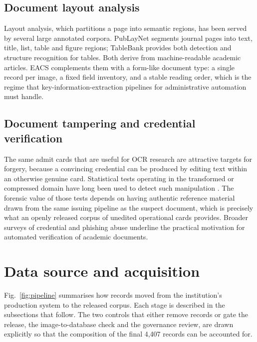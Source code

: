 \documentclass[a4paper,fleqn]{cas-dc}
\begin{document}
\subsection{Document layout analysis}

Layout analysis, which partitions a page into semantic regions, has been
served by several large annotated corpora. PubLayNet \citep{zhong2019}
segments journal pages into text, title, list, table and figure regions;
TableBank \citep{li2019} provides both detection and structure recognition for
tables. Both derive from machine-readable academic articles. EACS
complements them with a form-like document type: a single record per image,
a fixed field inventory, and a stable reading order, which is the regime that
key-information-extraction pipelines for administrative automation must handle.

\subsection{Document tampering and credential verification}

The same admit cards that are useful for OCR research are attractive targets
for forgery, because a convincing credential can be produced by editing text
within an otherwise genuine card. Statistical tests operating in the
transformed or compressed domain have long been used to detect such
manipulation \citep{fridrich2004,goljan2012}. The forensic value of those
tests depends on having authentic reference material drawn from the same
issuing pipeline as the suspect document, which is precisely what an openly
released corpus of unedited operational cards provides. Broader surveys of
credential and phishing abuse \citep{almakhour2018} underline the practical
motivation for automated verification of academic documents.

\section{Data source and acquisition}

Fig.~\ref{fig:pipeline} summarises how records moved from the institution's
production system to the released corpus. Each stage is described in the
subsections that follow. The two controls that either remove records or gate
the release, the image-to-database check and the governance review, are drawn
explicitly so that the composition of the final 4,407 records can be
accounted for.
\end{document}
